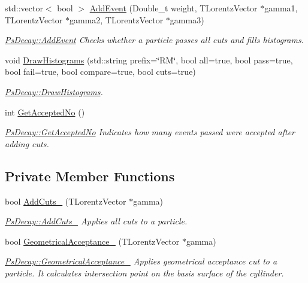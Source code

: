 \begin{DoxyCompactItemize}
std\+::vector$<$ bool $>$ \hyperlink{classPsDecay_a85fae0338b221eee90bf497819e71c84}{Add\+Event} (Double\+\_\+t weight, T\+Lorentz\+Vector $\ast$gamma1, T\+Lorentz\+Vector $\ast$gamma2, T\+Lorentz\+Vector $\ast$gamma3)
\begin{DoxyCompactList}\small\item\em \hyperlink{classPsDecay_a85fae0338b221eee90bf497819e71c84}{Ps\+Decay\+::\+Add\+Event} Checks whether a particle passes all cuts and fills histograms. \end{DoxyCompactList}\item 
void \hyperlink{classPsDecay_acf37a3232c075338710e7732da809fbe}{Draw\+Histograms} (std\+::string prefix=\char`\"{}RM\char`\"{}, bool all=true, bool pass=true, bool fail=true, bool compare=true, bool cuts=true)
\begin{DoxyCompactList}\small\item\em \hyperlink{classPsDecay_acf37a3232c075338710e7732da809fbe}{Ps\+Decay\+::\+Draw\+Histograms}. \end{DoxyCompactList}\item 
int \hyperlink{classPsDecay_ae53824e7c6ffc093053bf1aece564044}{Get\+Accepted\+No} ()
\begin{DoxyCompactList}\small\item\em \hyperlink{classPsDecay_ae53824e7c6ffc093053bf1aece564044}{Ps\+Decay\+::\+Get\+Accepted\+No} Indicates how many events passed were accepted after adding cuts. \end{DoxyCompactList}\end{DoxyCompactItemize}
\subsection*{Private Member Functions}
\begin{DoxyCompactItemize}
\item 
bool \hyperlink{classPsDecay_aa0df6edea1fa6961cbf5307a2c975e3b}{Add\+Cuts\+\_\+} (T\+Lorentz\+Vector $\ast$gamma)
\begin{DoxyCompactList}\small\item\em \hyperlink{classPsDecay_aa0df6edea1fa6961cbf5307a2c975e3b}{Ps\+Decay\+::\+Add\+Cuts\+\_\+} Applies all cuts to a particle. \end{DoxyCompactList}\item 
bool \hyperlink{classPsDecay_a183a1874ec37ec1eea0fe82fde501ef0}{Geometrical\+Acceptance\+\_\+} (T\+Lorentz\+Vector $\ast$gamma)
\begin{DoxyCompactList}\small\item\em \hyperlink{classPsDecay_a183a1874ec37ec1eea0fe82fde501ef0}{Ps\+Decay\+::\+Geometrical\+Acceptance\+\_\+} Applies geometrical acceptance cut to a particle. It calculates intersection point on the basis surface of the cyllinder. \end{DoxyCompactList}\end{DoxyCompactItemize}
